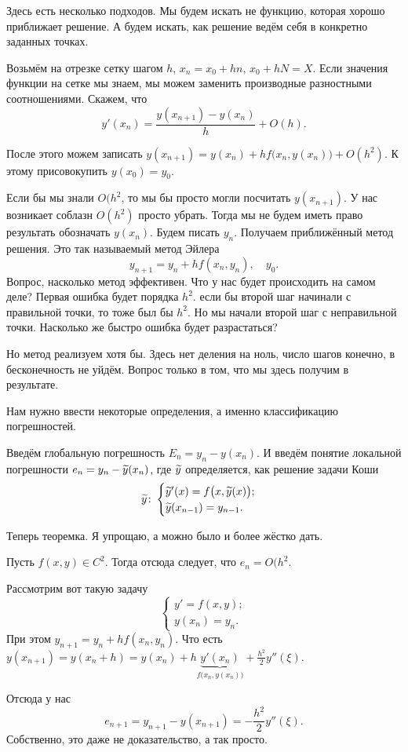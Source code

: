 Здесь есть несколько подходов. Мы будем искать не функцию, которая хорошо приближает решение. А будем искать, как решение ведём себя в конкретно заданных точках.

Возьмём на отрезке сетку шагом $h$, $x_n = x_0 + hn$, $x_0 + hN = X$. Если значения функции на сетке мы знаем, мы можем заменить производные разностными соотношениями. Скажем, что
\[
  y'(x_n) = \frac{y(x_{n+1}) - y(x_n)}{h} + O(h).
\]

После этого можем записать $y(x_{n+1}) = y(x_n) + h f\big(x_n,y(x_n)\big) + O(h^2)$. К этому присовокупить $y(x_0) = y_0$.

Если бы мы знали $O(h^2$, то мы бы просто могли посчитать $y(x_{n+1})$. У нас возникает соблазн $O(h^2)$ просто убрать. Тогда мы не будем иметь право результать обозначать $y(x_n)$. Будем писать $y_n$. Получаем приближённый метод решения. Это так называемый метод Эйлера
\[
  y_{n+1} = y_n + h f(x_n,y_n),\quad y_0.
\]
Вопрос, насколько метод эффективен. Что у нас будет происходить на самом деле? Первая ошибка будет порядка $h^2$. если бы второй шаг начинали с правильной точки, то тоже был бы $h^2$. Но мы начали второй шаг с неправильной точки. Насколько же быстро ошибка будет разрастаться?

Но метод реализуем хотя бы. Здесь нет деления на ноль, число шагов конечно, в бесконечность не уйдём. Вопрос только в том, что мы здесь получим в результате.

Нам нужно ввести некоторые определения, а именно классификацию погрешностей.

Введём глобальную погрешность $E_n = y_n - y(x_n)$. И введём понятие локальной погрешности $e_n = y_n - \widetilde{y}{}(x_n)$, где $\widetilde{y}{}$ определяется, как решение задачи Коши
\[
  \widetilde{y}{}\colon \begin{cases}
  \widetilde{y}{}'(x) = f\big(x,\widetilde{y}{}(x)\big);\\
  \widetilde{y}{}(x_{n-1}) = y_{n-1}.
\end{cases}
\]

Теперь теоремка. Я упрощаю, а можно было и более жёстко дать.

\begin{The}
  Пусть $f(x,y)\in C^2$. Тогда отсюда следует, что $e_n = O(h^2$.
\end{The}
\begin{Proof}
  Рассмотрим вот такую задачу
\[
  \begin{cases}
 y' = f(x,y);\\
 y(x_n) = y_n.
\end{cases}
\]
При этом $y_{n+1} = y_n + h f(x_n,y_n)$. Что есть $y(x_{n+1}) = y(x_n+h) = y(x_n) + h \underbrace{y'(x_n)}_{f\big(x_n,y(x_n)\big)} + \frac{h^2}2y''(\xi)$.

Отсюда у нас
\[
  e_{n+1} = y_{n+1} - y(x_{n+1}) = -\frac{h^2}2y''(\xi).
\]
Собственно, это даже не доказательство, а так просто.
\end{Proof}


